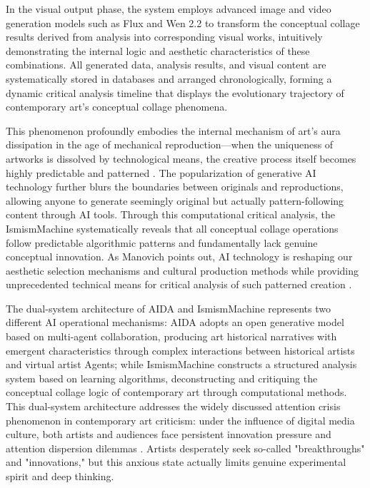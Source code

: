 \documentclass{article}
\begin{document}
In the visual output phase, the system employs advanced image and video generation models such as Flux and Wen 2.2 to transform the conceptual collage results derived from analysis into corresponding visual works, intuitively demonstrating the internal logic and aesthetic characteristics of these combinations. All generated data, analysis results, and visual content are systematically stored in databases and arranged chronologically, forming a dynamic critical analysis timeline that displays the evolutionary trajectory of contemporary art's conceptual collage phenomena.

This phenomenon profoundly embodies the internal mechanism of art's aura dissipation in the age of mechanical reproduction—when the uniqueness of artworks is dissolved by technological means, the creative process itself becomes highly predictable and patterned \cite{benjamin1969work}. The popularization of generative AI technology further blurs the boundaries between originals and reproductions, allowing anyone to generate seemingly original but actually pattern-following content through AI tools. Through this computational critical analysis, the IsmismMachine systematically reveals that all conceptual collage operations follow predictable algorithmic patterns and fundamentally lack genuine conceptual innovation. As Manovich points out, AI technology is reshaping our aesthetic selection mechanisms and cultural production methods while providing unprecedented technical means for critical analysis of such patterned creation \cite{manovich2018ai}.

The dual-system architecture of AIDA and IsmismMachine represents two different AI operational mechanisms: AIDA adopts an open generative model based on multi-agent collaboration, producing art historical narratives with emergent characteristics through complex interactions between historical artists and virtual artist Agents; while IsmismMachine constructs a structured analysis system based on learning algorithms, deconstructing and critiquing the conceptual collage logic of contemporary art through computational methods. This dual-system architecture addresses the widely discussed attention crisis phenomenon in contemporary art criticism: under the influence of digital media culture, both artists and audiences face persistent innovation pressure and attention dispersion dilemmas \cite{harman2018object}. Artists desperately seek so-called "breakthroughs" and "innovations," but this anxious state actually limits genuine experimental spirit and deep thinking.
\end{document}
